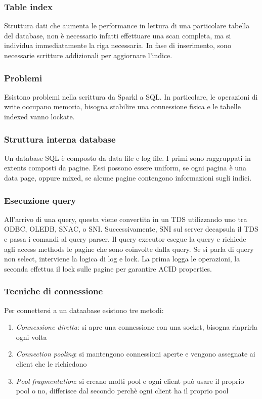 \subsubsection{Table index}
Struttura dati che aumenta le performance in lettura di una particolare tabella del 
database, non è necessario infatti effettuare una scan completa, ma si individua 
immediatamente la riga necessaria.
In fase di inserimento, sono necessarie scritture addizionali per aggiornare l'indice.

\subsubsection{Problemi}
Esistono problemi nella scrittura da Sparkl a SQL. In particolare, le operazioni di 
write occupano memoria, bisogna stabilire una connessione fisica e le tabelle indexed 
vanno lockate.

\subsubsection{Struttura interna database}
Un database SQL è composto da data file e log file. I primi sono raggruppati in extents 
composti da pagine. Essi possono essere uniform, se ogni pagina è una data page, oppure 
mixed, se alcune pagine contengono informazioni sugli indici.

\subsubsection{Esecuzione query}
All'arrivo di una query, questa viene convertita in un TDS utilizzando uno tra ODBC, 
OLEDB, SNAC, o SNI.
Successivamente, SNI sul server decapsula il TDS e passa i comandi al query parser.
Il query executor esegue la query e richiede agli access methods le pagine che sono 
coinvolte dalla query. Se si parla di query non select, interviene la logica di log e lock.
La prima logga le operazioni, la seconda effettua il lock sulle pagine per garantire ACID properties.

\subsubsection{Tecniche di connessione}
Per connettersi a un dataabase esistono tre metodi:
\begin{enumerate}
    \item \emph{Connessione diretta}: si apre una connessione con una socket, bisogna 
    riaprirla ogni volta
    \item \emph{Connection pooling}: si mantengono connessioni aperte e vengono assegnate 
    ai client che le richiedono
    \item \emph{Pool fragmentation}: si creano molti pool e ogni client può usare il proprio
     pool o no, differisce dal secondo perchè ogni client ha il proprio pool
\end{enumerate}

